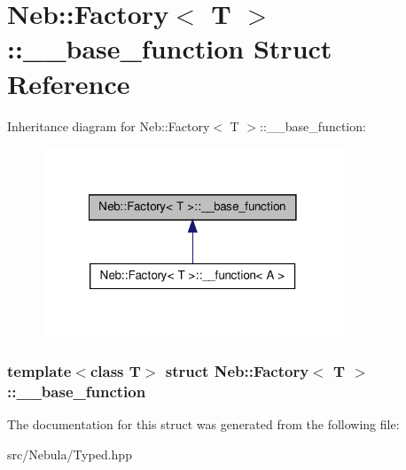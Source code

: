 \hypertarget{structNeb_1_1Factory_1_1____base__function}{\section{\-Neb\-:\-:\-Factory$<$ \-T $>$\-:\-:\-\_\-\-\_\-base\-\_\-function \-Struct \-Reference}
\label{structNeb_1_1Factory_1_1____base__function}
}


\-Inheritance diagram for \-Neb\-:\-:\-Factory$<$ \-T $>$\-:\-:\-\_\-\-\_\-base\-\_\-function\-:\nopagebreak
\begin{figure}[H]
\begin{center}
\leavevmode
\includegraphics[width=254pt]{structNeb_1_1Factory_1_1____base__function__inherit__graph}
\end{center}
\end{figure}
\subsubsection*{template$<$class T$>$ struct Neb\-::\-Factory$<$ T $>$\-::\-\_\-\-\_\-base\-\_\-function}



\-The documentation for this struct was generated from the following file\-:\begin{DoxyCompactItemize}
\item 
src/\-Nebula/\-Typed.\-hpp\end{DoxyCompactItemize}
